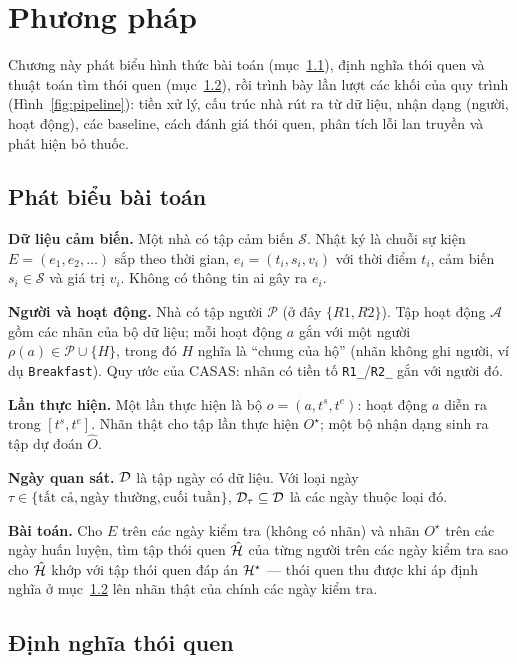 \chapter{Phương pháp}
\label{chap:method}

Chương này phát biểu hình thức bài toán (mục~\ref{sec:m-problem}), định nghĩa thói quen và thuật
toán tìm thói quen (mục~\ref{sec:m-habit}), rồi trình bày lần lượt các khối của quy trình
(Hình~\ref{fig:pipeline}): tiền xử lý, cấu trúc nhà rút ra từ dữ liệu, nhận dạng (người, hoạt động),
các baseline, cách đánh giá thói quen, phân tích lỗi lan truyền và phát hiện bỏ thuốc.

\section{Phát biểu bài toán}
\label{sec:m-problem}

\textbf{Dữ liệu cảm biến.} Một nhà có tập cảm biến $\mathcal S$. Nhật ký là chuỗi sự kiện
$E = (e_1, e_2, \dots)$ sắp theo thời gian, $e_i = (t_i, s_i, v_i)$ với thời điểm $t_i$, cảm biến
$s_i \in \mathcal S$ và giá trị $v_i$. Không có thông tin ai gây ra $e_i$.

\textbf{Người và hoạt động.} Nhà có tập người $\mathcal P$ (ở đây $\{R1, R2\}$). Tập hoạt động
$\mathcal A$ gồm các nhãn của bộ dữ liệu; mỗi hoạt động $a$ gắn với một người
$\rho(a) \in \mathcal P \cup \{H\}$, trong đó $H$ nghĩa là ``chung của hộ'' (nhãn không ghi người,
ví dụ \texttt{Breakfast}). Quy ước của CASAS: nhãn có tiền tố \texttt{R1\_}/\texttt{R2\_} gắn với
người đó.

\textbf{Lần thực hiện.} Một lần thực hiện là bộ $o = (a, t^{s}, t^{e})$: hoạt động $a$ diễn ra
trong $[t^s, t^e]$. Nhãn thật cho tập lần thực hiện $O^\star$; một bộ nhận dạng sinh ra tập dự đoán
$\hat O$.

\textbf{Ngày quan sát.} $\mathcal{D}$ là tập ngày có dữ liệu. Với loại ngày
$\tau \in \{\text{tất cả}, \text{ngày thường}, \text{cuối tuần}\}$, $\mathcal{D}_\tau \subseteq \mathcal{D}$ là các
ngày thuộc loại đó.

\textbf{Bài toán.} Cho $E$ trên các ngày kiểm tra (không có nhãn) và nhãn $O^\star$ trên các ngày huấn
luyện, tìm tập thói quen $\hat{\mathcal{H}}$ của từng người trên các ngày kiểm tra sao cho $\hat{\mathcal{H}}$ khớp với tập
thói quen đáp án $\mathcal{H}^\star$ --- thói quen thu được khi áp định nghĩa ở mục~\ref{sec:m-habit} lên
nhãn thật của chính các ngày kiểm tra.

\section{Định nghĩa thói quen}
\label{sec:m-habit}

